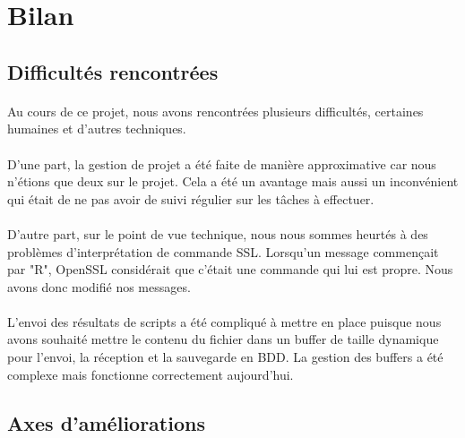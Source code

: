 \section{Bilan}

\subsection{Difficultés rencontrées}
\paragraph{}
Au cours de ce projet, nous avons rencontrées plusieurs difficultés, certaines humaines et d'autres techniques.
\paragraph{}
D'une part, la gestion de projet a été faite de manière approximative car nous n'étions que deux sur le projet. Cela a été un avantage mais aussi un inconvénient qui était de ne pas avoir de suivi régulier sur les tâches à effectuer.
\paragraph{}
D'autre part, sur le point de vue technique, nous nous sommes heurtés à des problèmes d'interprétation de commande SSL. Lorsqu'un message commençait par "R", OpenSSL considérait que c'était une commande qui lui est propre. Nous avons donc modifié nos messages.
\paragraph{}
L'envoi des résultats de scripts a été compliqué à mettre en place puisque nous avons souhaité mettre le contenu du fichier dans un buffer de taille dynamique pour l'envoi, la réception et la sauvegarde en BDD.
La gestion des buffers a été complexe mais fonctionne correctement aujourd'hui.

\subsection{Axes d'améliorations}
